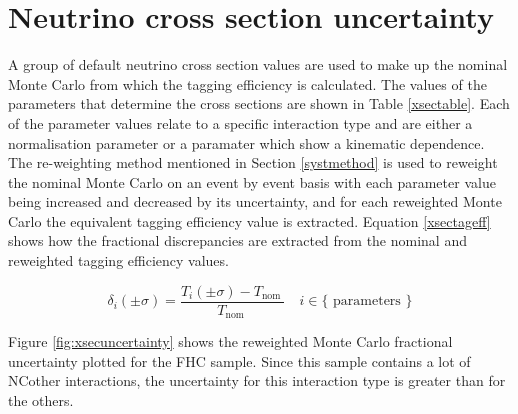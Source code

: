 \documentclass{article}
\begin{document}
\section{Neutrino cross section uncertainty}

A group of default neutrino cross section values are used to make up the nominal Monte Carlo from which the tagging efficiency is calculated. The values of the parameters that determine the cross sections are shown in Table \ref{xsectable}. Each of the parameter values relate to a specific interaction type and are either a normalisation parameter or a paramater which show a kinematic dependence. The re-weighting method mentioned in Section \ref{systmethod} is used to reweight the nominal Monte Carlo on an event by event basis with each parameter value being increased and decreased by its uncertainty, and for each reweighted Monte Carlo the equivalent tagging efficiency value is extracted. Equation \eqref{xsectageff} shows how the fractional discrepancies are extracted from the nominal and reweighted tagging efficiency values.

\begin{equation}
\delta_{i}(\pm \sigma)=\frac{T_{i}(\pm \sigma)-T_{\text {nom }}}{T_{\text {nom }}} \quad i \in\{\text { parameters }\}
\label{xsectageff}
\end{equation}

Figure \ref{fig:xsecuncertainty} shows the reweighted Monte Carlo fractional uncertainty plotted for the FHC sample. Since this sample contains a lot of NCother interactions, the uncertainty for this interaction type is greater than for the others.
\end{document}
